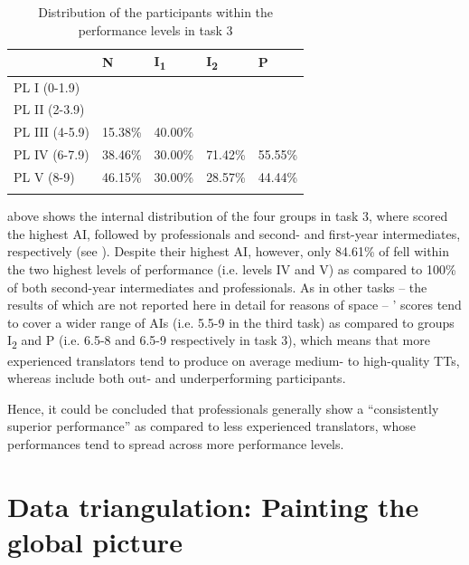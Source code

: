 \documentclass[output=paper]{LSP/langsci}
\begin{document}
\begin{table}
 \caption{Distribution of the participants within the performance levels in task 3}
 \label{quinci:tab:6}
\begin{tabularx}{\textwidth}{XXXXX}
\lsptoprule
\multicolumn{1}{X}{Task 3} & \multicolumn{1}{X}{N} & \multicolumn{1}{X}{ I\textsubscript{1}} & \multicolumn{1}{X}{I\textsubscript{2}} & \multicolumn{1}{X}{P}\\
\midrule
PL I (0-1.9) &  &  &  & \\
PL II (2-3.9) &  &  &  & \\
PL III (4-5.9) & 15.38\% & 40.00\% &  & \\
PL IV (6-7.9) & 38.46\% & 30.00\% & 71.42\% & 55.55\%\\
PL V (8-9) & 46.15\% & 30.00\% & 28.57\% & 44.44\%\\
\lspbottomrule
\end{tabularx}
\end{table}

 above shows the internal distribution of the four groups in task 3, where  scored the highest AI, followed by professionals and second- and first-year intermediates, respectively (see ). Despite their highest AI, however, only 84.61\% of  fell within the two highest levels of performance (i.e. levels IV and V) as compared to 100\% of both second-year intermediates and professionals. As in other tasks -- the results of which are not reported here in detail for reasons of space -- ' scores tend to cover a wider range of AIs (i.e. 5.5-9 in the third task) as compared to groups I\textsubscript{2} and P (i.e. 6.5-8 and 6.5-9 respectively in task 3), which means that more experienced translators tend to produce on average medium- to high-quality TTs, whereas  include both out- and underperforming participants.

Hence, it could be concluded that professionals generally show a ``consistently superior performance'' \citep[215]{Jaaskelainen2010} as compared to less experienced translators, whose performances tend to spread across more performance levels.

\section{Data triangulation: Painting the global picture}
\end{document}
